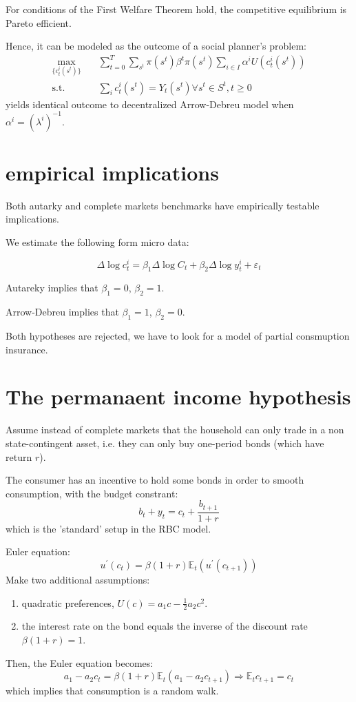 For conditions of the First Welfare Theorem hold, the competitive equilibrium is Pareto efficient.

Hence, it can be modeled as the outcome of a social planner's problem:
\begin{align*}
    \max_{\{c_t^i(s^t)\}} &\quad \sum_{t=0}^{T} \sum_{s^t} \pi(s^t) \beta^t \pi(s^t) \sum_{i \in I} \alpha^i U(c_t^i(s^t)) \\
    \text{s.t.} &\quad \sum_{i} c_t^i(s^t) = Y_t(s^t) \forall s^t \in S^t, t \geq 0
\end{align*}
yields identical outcome to decentralized Arrow-Debreu model when $\alpha ^i = (\lambda^i)^{-1}. $

\section{empirical implications}
Both autarky and complete markets benchmarks have empirically
testable implications. 

We estimate the following form micro data:

\[\Delta \log c_t^i = \beta_1 \Delta \log C_t + \beta_2 \Delta \log y_t^i + \varepsilon_t\]

Autareky implies that $\beta_1 = 0$, $\beta_2 = 1$.

Arrow-Debreu implies that $\beta_1 = 1$, $\beta_2 = 0$.

Both hypotheses are rejected, we have to look for a model of partial consmuption insurance.

\section{The permanaent income hypothesis}
Assume instead of complete markets that the household can only
trade in a non state-contingent asset, i.e. they can only buy
one-period bonds (which have return $r$).

The consumer has an incentive to hold some bonds in order to
smooth consumption, with the budget constrant:
\[b_t + y_t = c_t + \frac{b_{t+1}}{1+r}\]
which is the 'standard' setup in the RBC model.

Euler equation:
\[u^{\prime} (c_t) = \beta (1+r) \mathbb{E}_t (u^{\prime} (c_{t+1} ))\]
Make two additional assumptions:
\begin{enumerate}
    \item quadratic preferences, $U(c) = a_{1}c - \frac{1}{2}a_2 c^2 $.
    \item the interest rate on the bond equals the inverse of the
    discount rate $\beta (1+r) = 1$.
\end{enumerate}
Then, the Euler equation becomes:
\[a_1 - a_2 c_t = \beta (1+r) \mathbb{E}_t (a_1 - a_2 c_{t+1} ) \Rightarrow \mathbb{E}_t c_{t+1} = c_t \]
which implies that consumption is a random walk.

